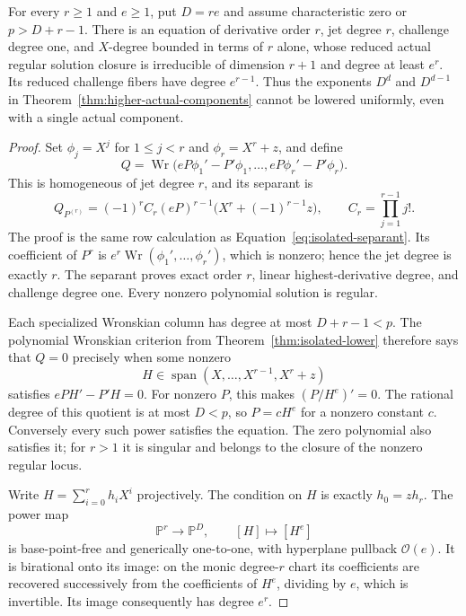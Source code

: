 \begin{theorem}
\label{thm:positive-component-sharpness}
For every $r\ge1$ and $e\ge1$, put $D=re$ and assume characteristic
zero or $p>D+r-1$. There is an equation of derivative order $r$,
jet degree $r$, challenge degree one, and $X$-degree bounded in terms
of $r$ alone, whose reduced actual regular
solution closure is irreducible of dimension $r+1$ and degree at
least $e^r$. Its reduced challenge fibers have degree $e^{r-1}$.
Thus the exponents $D^d$ and $D^{d-1}$ in
Theorem~\ref{thm:higher-actual-components} cannot be lowered uniformly,
even with a single actual component.
\end{theorem}
\begin{proof}
Set $\phi_j=X^j$ for $1\le j<r$ and $\phi_r=X^r+z$, and define
\[
 Q=\operatorname{Wr}\bigl(eP\phi_1'-P'\phi_1,\ldots,
                           eP\phi_r'-P'\phi_r\bigr).
\]
This is homogeneous of jet degree $r$, and its separant is
\[
 Q_{P^{(r)}}=(-1)^r C_r(eP)^{r-1}
               \bigl(X^r+(-1)^{r-1}z\bigr),
 \qquad C_r=\prod_{j=1}^{r-1}j!.
\]
The proof is the same row calculation as
Equation~\eqref{eq:isolated-separant}. Its coefficient of $P^r$
is $e^r\operatorname{Wr}(\phi_1',\ldots,\phi_r')$, which is
nonzero; hence the jet degree is exactly $r$. The separant proves
exact order $r$, linear highest-derivative degree, and challenge
degree one. Every nonzero polynomial solution is regular.

Each specialized Wronskian column has degree at most $D+r-1<p$.
The polynomial Wronskian criterion from
Theorem~\ref{thm:isolated-lower} therefore says that $Q=0$ precisely
when some nonzero
\[
 H\in\operatorname{span}(X,\ldots,X^{r-1},X^r+z)
\]
satisfies $ePH'-P'H=0$. For nonzero $P$, this makes
$(P/H^e)'=0$. The rational degree of this quotient is at most
$D<p$, so $P=cH^e$ for a nonzero constant $c$. Conversely every
such power satisfies the equation. The zero polynomial also
satisfies it; for $r>1$ it is singular and belongs to the closure
of the nonzero regular locus.

Write $H=\sum_{i=0}^r h_iX^i$ projectively. The condition on $H$
is exactly $h_0=zh_r$. The power map
\[
 \mathbb P^r\longrightarrow\mathbb P^D,\qquad [H]\longmapsto[H^e]
\]
is base-point-free and generically one-to-one, with hyperplane
pullback $\mathcal O(e)$. It is birational onto its image: on the
monic degree-$r$ chart its coefficients are recovered successively
from the coefficients of $H^e$, dividing by $e$, which is invertible.
Its image consequently has degree $e^r$.


\end{proof}
